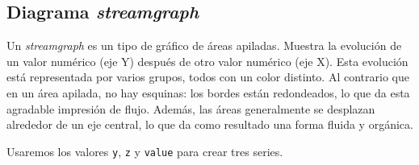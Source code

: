 \documentclass[
]{book}
\newenvironment{Shaded}{\begin{snugshade}}{\end{snugshade}}
\newcommand{\AttributeTok}[1]{\textcolor[rgb]{0.77,0.63,0.00}{#1}}
\newcommand{\ConstantTok}[1]{\textcolor[rgb]{0.00,0.00,0.00}{#1}}
\newcommand{\FunctionTok}[1]{\textcolor[rgb]{0.00,0.00,0.00}{#1}}
\newcommand{\NormalTok}[1]{#1}
\newcommand{\SpecialCharTok}[1]{\textcolor[rgb]{0.00,0.00,0.00}{#1}}
\newcommand{\StringTok}[1]{\textcolor[rgb]{0.31,0.60,0.02}{#1}}
\begin{document}
\hypertarget{diagrama-streamgraph}{%
\subsection{\texorpdfstring{Diagrama \emph{streamgraph}}{Diagrama streamgraph}}\label{diagrama-streamgraph}}

Un \emph{streamgraph} es un tipo de gráfico de áreas apiladas. Muestra la evolución de un valor numérico (eje Y) después de otro valor numérico (eje X). Esta evolución está representada por varios grupos, todos con un color distinto. Al contrario que en un área apilada, no hay esquinas: los bordes están redondeados, lo que da esta agradable impresión de flujo. Además, las áreas generalmente se desplazan alrededor de un eje central, lo que da como resultado una forma fluida y orgánica.

Usaremos los valores \texttt{y}, \texttt{z} y \texttt{value} para crear tres series.

\begin{Shaded}
\end{Shaded}
\end{document}
